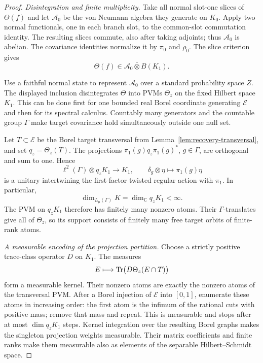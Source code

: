 \begin{proof}
\emph{Disintegration and finite multiplicity.}
Take all normal slot-one slices of $\Theta(f)$ and let $\mathcal A_0$
be the von Neumann algebra they generate on $K_0$.  Apply two normal
functionals, one in each branch slot, to the common-slot commutation
identity.  The resulting slices commute, also after taking adjoints;
thus $\mathcal A_0$ is abelian.  The covariance identities normalize it
by $\pi_0$ and $\rho_0$.  The slice criterion gives
\[
 \Theta(f)\in\mathcal A_0\bar\otimes B(K_1).
\]

Use a faithful normal state to represent $\mathcal A_0$ over a standard
probability space $Z$.  The displayed inclusion disintegrates $\Theta$
into PVMs $\Theta_z$ on the fixed Hilbert space $K_1$.  This can be done
first for one bounded real Borel coordinate generating $\mathscr E$ and
then for its spectral calculus.  Countably many generators and the
countable group $\Gamma$ make target covariance hold simultaneously
outside one null set.

Let $T\subset\mathscr E$ be the Borel target transversal from
Lemma~\ref{lem:recovery-transversal}, and set $q_z=\Theta_z(T)$.  The
projections $\pi_1(g)q_z\pi_1(g)^*$, $g\in\Gamma$, are orthogonal
and sum to one.  Hence
\[
 \ell^2(\Gamma)\otimes q_zK_1\longrightarrow K_1,
 \qquad \delta_g\otimes\eta\longmapsto\pi_1(g)\eta
\]
is a unitary intertwining the first-factor twisted regular action with
$\pi_1$.  In particular,
\[
 \dim_{L_\mu(\Gamma)}K=\dim_{\mathbb C}q_zK_1<\infty.
\]
The PVM on $q_zK_1$ therefore has finitely many nonzero atoms.  Their
$\Gamma$-translates give all of $\Theta_z$, so its support consists of
finitely many free target orbits of finite-rank atoms.

\emph{A measurable encoding of the projection partition.}
Choose a strictly positive trace-class operator $D$ on $K_1$.  The
measures
\[
 E\longmapsto\operatorname{Tr}\bigl(D\Theta_z(E\cap T)\bigr)
\]
form a measurable kernel.  Their nonzero atoms are exactly the nonzero
atoms of the transversal PVM.  After a Borel injection of $\mathscr E$
into $[0,1]$, enumerate these atoms in increasing order: the first atom
is the infimum of the rational cuts with positive mass; remove that
mass and repeat.  This is measurable and stops after at most
$\dim q_zK_1$ steps.  Kernel integration over the resulting Borel graphs
makes the singleton projection weights measurable.  Their matrix
coefficients and finite ranks make them measurable also as elements of
the separable Hilbert--Schmidt space.


\end{proof}
